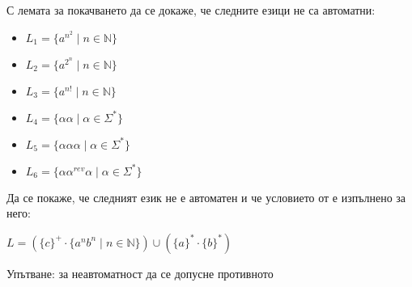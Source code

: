 \begin{problem}
С лемата за покачването да се докаже, че следните езици не са автоматни:
\begin{itemize}
    \item $L_1 = \{ a^{n^2} \mid n \in \mathbb{N} \}$
    \item $L_2 = \{ a^{2^n} \mid n \in \mathbb{N} \}$
    \item $L_3 = \{ a^{n!} \mid n \in \mathbb{N} \}$
    \item $L_4 = \{ \alpha \alpha \mid \alpha \in \Sigma^* \}$
    \item $L_5 = \{ \alpha \alpha \alpha \mid \alpha \in \Sigma^* \}$
    \item $L_6 = \{ \alpha \alpha^{rev} \alpha \mid \alpha \in \Sigma^* \}$
\end{itemize}
\end{problem}

\begin{problem}
Да се покаже, че следният език не е автоматен и че условието от  е изпълнено за него:
\begin{center}
    $L = (\{ c \}^+ \cdot \{ a^nb^n \mid n \in \mathbb{N} \}) \cup (\{ a \}^* \cdot \{ b \}^*)$
\end{center}
Упътване: за неавтоматност да се допусне противното
\end{problem}